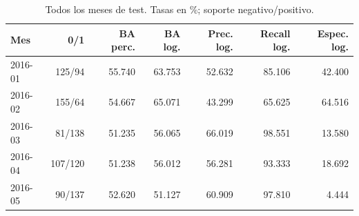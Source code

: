 \begin{table}[htbp]
\centering\small
\caption{Todos los meses de test. Tasas en \%; soporte negativo/positivo.}\label{tab:mensual}
\begin{tabular}{lrrrrrr}\toprule
Mes & 0/1 & BA perc. & BA log. & Prec. log. & Recall log. & Espec. log. \\ \midrule
2016-01 & 125/94 & 55.740 & 63.753 & 52.632 & 85.106 & 42.400 \\
2016-02 & 155/64 & 54.667 & 65.071 & 43.299 & 65.625 & 64.516 \\
2016-03 & 81/138 & 51.235 & 56.065 & 66.019 & 98.551 & 13.580 \\
2016-04 & 107/120 & 51.238 & 56.012 & 56.281 & 93.333 & 18.692 \\
2016-05 & 90/137 & 52.620 & 51.127 & 60.909 & 97.810 & 4.444 \\
\bottomrule\end{tabular}
\end{table}
